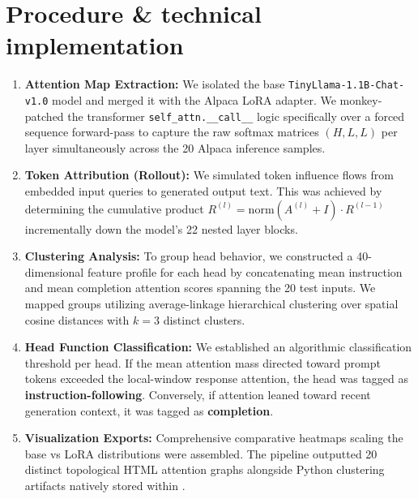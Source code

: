 \documentclass[10pt,a4paper]{article}
\begin{document}
\section*{Procedure \& technical implementation}
\begin{enumerate}
  \item \textbf{Attention Map Extraction:} We isolated the base \texttt{TinyLlama-1.1B-Chat-v1.0} model and merged it with the Alpaca LoRA adapter. We monkey-patched the transformer \texttt{self\_attn.\_\_call\_\_} logic specifically over a forced sequence forward-pass to capture the raw softmax matrices $(H, L, L)$ per layer simultaneously across the 20 Alpaca inference samples.
  \item \textbf{Token Attribution (Rollout):} We simulated token influence flows from embedded input queries to generated output text. This was achieved by determining the cumulative product $R^{(l)} = \mathrm{norm}(A^{(l)}+I)\cdot R^{(l-1)}$ incrementally down the model's 22 nested layer blocks.
  \item \textbf{Clustering Analysis:} To group head behavior, we constructed a 40-dimensional feature profile for each head by concatenating mean instruction and mean completion attention scores spanning the 20 test inputs. We mapped groups utilizing average-linkage hierarchical clustering over spatial cosine distances with $k=3$ distinct clusters.
  \item \textbf{Head Function Classification:} We established an algorithmic classification threshold per head. If the mean attention mass directed toward prompt tokens exceeded the local-window response attention, the head was tagged as \textbf{instruction-following}. Conversely, if attention leaned toward recent generation context, it was tagged as \textbf{completion}.
  \item \textbf{Visualization Exports:} Comprehensive comparative heatmaps scaling the base vs LoRA distributions were assembled. The pipeline outputted 20 distinct topological HTML attention graphs alongside Python clustering artifacts natively stored within .
\end{enumerate}
\end{document}
